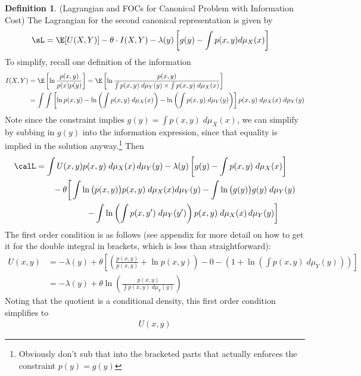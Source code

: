 \documentclass[12pt]{article}
\theoremstyle{plain}
\theoremstyle{definition}
\newtheorem{defn}[thm]{Definition}
\theoremstyle{remark}
\begin{document}
\begin{defn}
(Lagrangian and FOCs for Canonical Problem with Information Cost)
The Lagrangian for the second canonical representation is given by
\begin{align*}
  \sL
  &=
  \E[U(X,Y)]
  - \theta\cdot I(X,Y)
  -
  \lambda(y)
  \left[
    g(y) - \int p(x,y)d\mu_X(x)
  \right]
\end{align*}
To simplify, recall one definition of the information
\begin{align*}
  I(X,Y)
  &=
  \E\left[\ln \frac{p(x,y)}{p(x)p(y)}\right]
  =
  \E\left[
    \ln
    \frac{p(x,y)}{%
      \int p(x,y)\;d\mu_Y(y) \times \int p(x,y)\;d\mu_X(x)
    }
  \right]
  \\
  &=
  \int\int
  \left[
    \ln p(x,y)
    - \ln\left(\int p(x,y)\;d\mu_X(x)\right)
    - \ln\left(\int p(x,y)\;d\mu_Y(y)\right)
  \right]
  p(x,y)
  \;d\mu_X(x)\;d\mu_Y(y)
\end{align*}
Note since the constraint implies $g(y)=\int p(x,y)\;d\mu_X(x)$, we can
simplify by subbing in $g(y)$ into the information expression,
since that equality is implied in the solution anyway.\footnote{%
  Obviously don't sub that into the bracketed parts that actually
  enforces the constraint $p(y)=g(y)$
}
Then
\begin{align*}
  \calL
  &=
  \int U(x,y) p(x,y)\;d\mu_X(x)\,d\mu_Y(y)
  -
  \lambda(y)
  \left[
  g(y)
  -
  \int p(x,y)\;d\mu_X(x)
  \right]
  \\
  &\qquad
  -
  \theta
  \bigg[
  \int \ln\big(p(x,y)\big) p(x,y)\;d\mu_X(x)d\mu_Y(y)
  - \int \ln\big(g(y)\big) g(y)\;d\mu_Y(y)
  \\
  &\qquad\qquad\qquad
  - \int \ln \left(\int p(x,y')\;d\mu_Y(y')\right)
      p(x,y)\;d\mu_X(x)\,d\mu_Y(y)
  \bigg]
\end{align*}
The first order condition is as follows (see appendix for more detail on
how to get it for the double integral in brackets, which is less than
straightforward):
\begin{align*}
  U(x,y)
  &=
  -\lambda(y)
  +
  \theta
  \left[
  \left(
  \frac{p(x,y)}{p(x,y)}
  + \ln p(x,y)
  \right)
  - 0
  - \left(
  1+\ln\left(\int p(x,y)\; d\mu_Y(y)\right)
  \right)
  \right]
  \\
  &=
  -\lambda(y)
  +
  \theta
  \ln\left(
  \frac{p(x,y)}{\int p(x,y)\; d\mu_Y(y)}
  \right)
\end{align*}
Noting that the quotient is a conditional density, this first order
condition simplifies to
\begin{align*}
  U(x,y)

\end{align*}
\end{defn}
\end{document}
